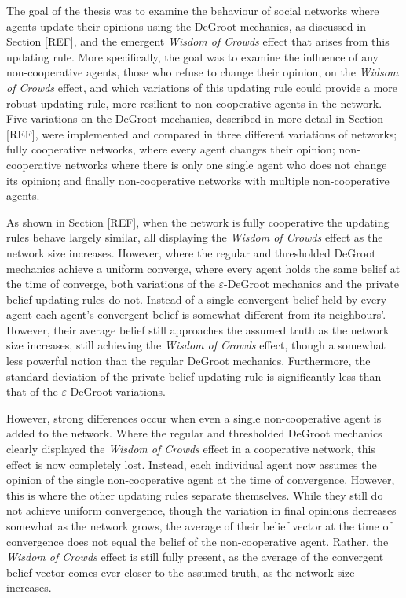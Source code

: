 \documentclass{article}
\begin{document}
The goal of the thesis was to examine the behaviour of social networks where agents update their opinions using the DeGroot mechanics, as discussed in Section [REF], and the emergent \emph{Wisdom of Crowds} effect that arises from this updating rule. More specifically, the goal was to examine the influence of any non-cooperative agents, those who refuse to change their opinion, on the \emph{Widsom of Crowds} effect, and which variations of this updating rule could provide a more robust updating rule, more resilient to non-cooperative agents in the network. Five variations on the DeGroot mechanics, described in more detail in Section [REF], were implemented and compared in three different variations of networks; fully cooperative networks, where every agent changes their opinion; non-cooperative networks where there is only one single agent who does not change its opinion; and finally non-cooperative networks with multiple non-cooperative agents. 

\noindent As shown in Section [REF], when the network is fully cooperative the updating rules behave largely similar, all displaying the \emph{Wisdom of Crowds} effect as the network size increases. However, where the regular and thresholded DeGroot mechanics achieve a uniform converge, where every agent holds the same belief at the time of converge, both variations of the $\varepsilon$-DeGroot mechanics and the private belief updating rules do not. Instead of a single convergent belief held by every agent each agent's convergent belief is somewhat different from its neighbours'. However, their average belief still approaches the assumed truth as the network size increases, still achieving the \emph{Wisdom of Crowds} effect, though a somewhat less powerful notion than the regular DeGroot mechanics. Furthermore, the standard deviation of the private belief updating rule is significantly less than that of the $\varepsilon$-DeGroot variations.

\noindent However, strong differences occur when even a single non-cooperative agent is added to the network. Where the regular and thresholded DeGroot mechanics clearly displayed the \emph{Wisdom of Crowds} effect in a cooperative network, this effect is now completely lost. Instead, each individual agent now assumes the opinion of the single non-cooperative agent at the time of convergence. However, this is where the other updating rules separate themselves. While they still do not achieve uniform convergence, though the variation in final opinions decreases somewhat as the network grows, the average of their belief vector at the time of convergence does not equal the belief of the non-cooperative agent. Rather, the \emph{Wisdom of Crowds} effect is still fully present, as the average of the convergent belief vector comes ever closer to the assumed truth, as the network size increases.
\end{document}
